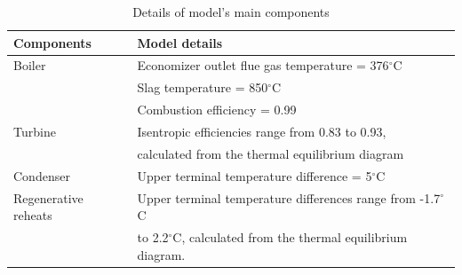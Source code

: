 \documentclass[preprint,12pt]{elsarticle}
\begin{document}
\begin{table}
\caption{Details of model's main components}
\label{table:model_details}
\begin{centering}
\begin{tabular}{ll}
\toprule 
Components 				& Model details\tabularnewline
\midrule
Boiler         			& Economizer outlet flue gas temperature = 376$^\circ$C \tabularnewline
 						& Slag temperature = 850$^\circ$C \tabularnewline
 						& Combustion efficiency = 0.99\tabularnewline
Turbine 				& Isentropic efficiencies range from 0.83 to 0.93, \tabularnewline
 						& calculated from the thermal equilibrium diagram\tabularnewline
Condenser 				& Upper terminal temperature difference = 5$^\circ$C \tabularnewline
Regenerative reheats 	& Upper terminal temperature differences range from -1.7$^\circ$C{}  \tabularnewline
 						& to 2.2$^\circ$C, calculated from the thermal equilibrium diagram.\tabularnewline
\bottomrule
\end{tabular}
\par\end{centering}
\end{table}
\end{document}
